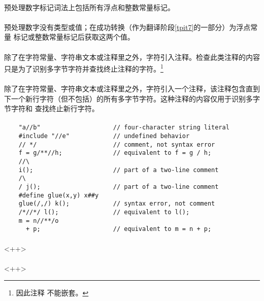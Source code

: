 \paragraph{}
预处理数字标记词法上包括所有浮点和整数常量标记。

\semantic
\paragraph{}
预处理数字没有类型或值；在成功转换（作为翻译阶段\ref{tpit7}的一部分）为浮点常量
标记或整数常量标记后获取这两个值。

\paragraph{}
除了在字符常量、字符串文本或注释里之外，字符\tm{/*}引入注释。检查此类注释的内容
只是为了识别多字节字符并查找终止注释的字符\tm{*/}。\footnote{因此注释
不能嵌套。}

\paragraph{}
除了在字符常量、字符串文本或注释里之外，字符\tm{//}引入一个注释，该注释包含直到
下一个新行字符（但不包括）的所有多字节字符。这种注释的内容仅用于识别多字节字符和
查找终止新行字符。

\paragraph{}
\ex*
\begin{lstlisting}
    "a//b"                    // four-character string literal
    #include "//e"            // undefined behavior
    // */                     // comment, not syntax error
    f = g/**//h;              // equivalent to f = g / h;
    //\
    i();                      // part of a two-line comment
    /\
    / j();                    // part of a two-line comment
    #define glue(x,y) x##y
    glue(/,/) k();            // syntax error, not comment
    /*//*/ l();               // equivalent to l();
    m = n//**/o
      + p;                    // equivalent to m = n + p;
\end{lstlisting}

\paragraph{}<++>
\paragraph{}<++>
